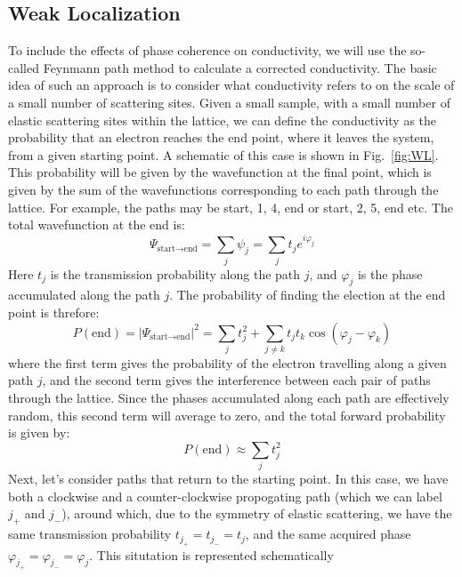\subsection{Weak Localization}
To include the effects of phase coherence on conductivity, we will use the so-called Feynmann path method to calculate
a corrected conductivity. The basic idea of such an approach is to consider what conductivity refers to on the scale of
a small number of scattering sites. Given a small sample, with a small number of elastic scattering sites within the lattice,
we can define the conductivity as the probability that an electron reaches the end point, where it leaves the system,
from a given starting point. A schematic of this case is shown in Fig.~\ref{fig:WL}. This
probability will be given by the wavefunction at the final point, which is given by the sum of the wavefunctions corresponding
to each path through the lattice. For example, the paths may be {start, 1, 4, end} or {start, 2, 5, end} etc. The total wavefunction at the end is:
\begin{equation}
  \Psi_{\textrm{start}\rightarrow\textrm{end}} = \sum_j \psi_j = \sum_j t_j e^{i \varphi_j}
\end{equation}
Here $t_j$ is the transmission probability along the path $j$, and $\varphi_j$ is the phase accumulated along the path $j$.
The probability of finding the election at the end point is threfore:
\begin{equation}
  P(\textrm{end}) = \left|\Psi_{\textrm{start}\rightarrow\textrm{end}}\right|^2 = \sum_j t_j^2 + \sum_{j \neq k} t_jt_k \cos(\varphi_j - \varphi_k)
\end{equation}
where the first term gives the probability of the electron travelling along a given path $j$, and the second term gives the
interference between each pair of paths through the lattice. Since the phases accumulated along each path are effectively random,
this second term will average to zero, and the total forward probability is given by:
\begin{equation}
P(\textrm{end}) \approx \sum_j t_j^2
\end{equation}
Next, let's consider paths that return to the starting point. In this case, we have both a clockwise and a counter-clockwise propogating
path (which we can label $j_+$ and $j_-$), around which, due to the symmetry of elastic scattering, we have the same transmission
probability $t_{j_+} = t_{j_-} = t_j$, and the same acquired phase $\varphi_{j_+} = \varphi_{j_-} = \varphi_j$. This situtation is represented schematically

